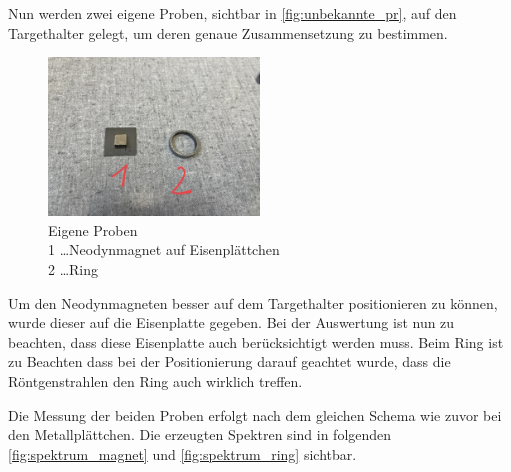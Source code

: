 \documentclass[12pt,english,ngerman]{scrartcl}
\begin{document}
Nun werden zwei eigene Proben, sichtbar in \autoref{fig:unbekannte_pr}, auf den
Targethalter gelegt, um deren genaue Zusammensetzung zu bestimmen.

\begin{figure}[H]
	\begin{center}
		\includegraphics[width =0.5\textwidth]{./figures/eigene_proben.jpg}
	\end{center}
	\caption[Eigene Proben] {Eigene Proben                           \\
		1 \dots Neodynmagnet auf Eisenplättchen \\
		2 \dots Ring
	}\label{fig:unbekannte_pr}
\end{figure}

Um den Neodynmagneten besser auf dem Targethalter positionieren zu können,
wurde dieser auf die Eisenplatte gegeben. Bei der Auswertung ist nun zu
beachten, dass diese Eisenplatte auch berücksichtigt werden muss. Beim Ring ist
zu Beachten dass bei der Positionierung darauf geachtet wurde, dass die
Röntgenstrahlen den Ring auch wirklich treffen.

Die Messung der beiden Proben erfolgt nach dem gleichen Schema wie zuvor bei
den Metallplättchen. Die erzeugten Spektren sind in folgenden
\autoref{fig:spektrum_magnet} und \autoref{fig:spektrum_ring} sichtbar.
\end{document}
